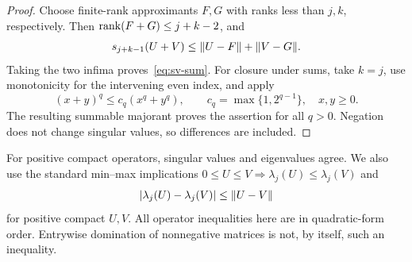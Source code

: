 \begin{proof}
Choose finite-rank approximants $F,G$ with ranks less than $j,k$,
respectively. Then $\operatorname{rank}(F+G)\le j+k-2$, and
\[
 s_{j+k-1}(U+V)\le\lVert U-F\rVert+\lVert V-G\rVert.
\]
Taking the two infima proves~\eqref{eq:sv-sum}. For closure under
sums, take $k=j$, use monotonicity for the intervening even index,
and apply
\[
 (x+y)^q\le c_q(x^q+y^q),\qquad
 c_q=\max\{1,2^{q-1}\},\quad x,y\ge0.
\]
The resulting summable majorant proves the assertion for all $q>0$.
Negation does not change singular values, so differences are included.
\end{proof}

For positive compact operators, singular values and eigenvalues agree.
We also use the standard min--max implications
$0\le U\le V\Rightarrow\lambda_j(U)\le\lambda_j(V)$ and
\begin{equation}
 |\lambda_j(U)-\lambda_j(V)|\le\lVert U-V\rVert
 \label{eq:eigen-lipschitz}
\end{equation}
for positive compact $U,V$. All operator inequalities here are in
quadratic-form order. Entrywise domination of nonnegative matrices is
not, by itself, such an inequality.
